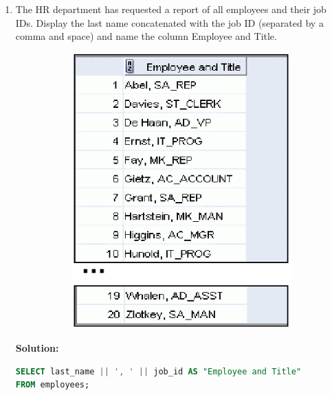 \documentclass[a4paper,12pt]{article}
\begin{document}
\begin{enumerate}[start=8]
    \newpage
    \item The HR department has requested a report of all employees and their job IDs. Display the last name concatenated with the job ID (separated by a comma and space) and name the column Employee and Title.
    \begin{figure}[h]
        \centering
        \begin{subfigure}[b]{0.5\linewidth}
            \centering
            \includegraphics[width=\linewidth]{graphics/9.png}
        \end{subfigure}
    \end{figure}
    
    \textbf{Solution: }
    \begin{lstlisting}[language=SQL, label={lst:concat_query}]
SELECT last_name || ', ' || job_id AS "Employee and Title"
FROM employees;
    \end{lstlisting}
    

\end{enumerate}
\end{document}
